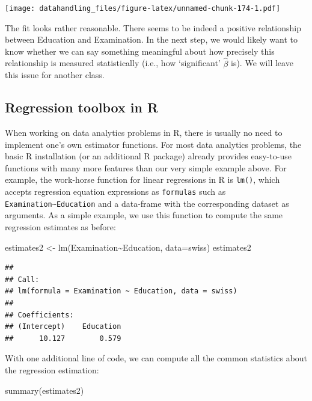 \documentclass[
  12pt,
]{style/krantz}
\newenvironment{Shaded}{\begin{snugshade}}{\end{snugshade}}
\newcommand{\AttributeTok}[1]{\textcolor[rgb]{0.77,0.63,0.00}{#1}}
\newcommand{\FunctionTok}[1]{\textcolor[rgb]{0.00,0.00,0.00}{#1}}
\newcommand{\NormalTok}[1]{#1}
\newcommand{\OtherTok}[1]{\textcolor[rgb]{0.56,0.35,0.01}{#1}}
\newcommand{\SpecialCharTok}[1]{\textcolor[rgb]{0.00,0.00,0.00}{#1}}
\begin{document}
\texttt{[image: datahandling\_files/figure-latex/unnamed-chunk-174-1.pdf]}

The fit looks rather reasonable. There seems to be indeed a positive relationship between Education and Examination. In the next step, we would likely want to know whether we can say something meaningful about how precisely this relationship is measured statistically (i.e., how `significant' \(\hat{\beta}\) is). We will leave this issue for another class.

\hypertarget{regression-toolbox-in-r}{%
\subsection{Regression toolbox in R}\label{regression-toolbox-in-r}}

When working on data analytics problems in R, there is usually no need to implement one's own estimator functions. For most data analytics problems, the basic R installation (or an additional R package) already provides easy-to-use functions with many more features than our very simple example above. For example, the work-horse function for linear regressions in R is \texttt{lm()}, which accepts regression equation expressions as \texttt{formulas} such as \texttt{Examination\textasciitilde{}Education} and a data-frame with the corresponding dataset as arguments. As a simple example, we use this function to compute the same regression estimates as before:

\begin{Shaded}
\begin{Highlighting}[]
\NormalTok{estimates2 }\OtherTok{\textless{}{-}} \FunctionTok{lm}\NormalTok{(Examination}\SpecialCharTok{\textasciitilde{}}\NormalTok{Education, }\AttributeTok{data=}\NormalTok{swiss)}
\NormalTok{estimates2}
\end{Highlighting}
\end{Shaded}

\begin{verbatim}
## 
## Call:
## lm(formula = Examination ~ Education, data = swiss)
## 
## Coefficients:
## (Intercept)    Education  
##      10.127        0.579
\end{verbatim}

With one additional line of code, we can compute all the common statistics about the regression estimation:

\begin{Shaded}
\begin{Highlighting}[]
\FunctionTok{summary}\NormalTok{(estimates2)}
\end{Highlighting}
\end{Shaded}
\end{document}

